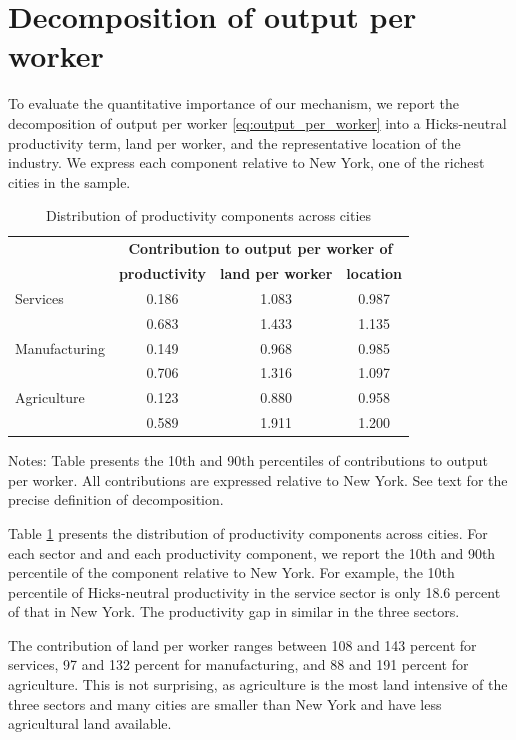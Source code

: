\documentclass[12pt]{article}
\begin{document}
\section{Decomposition of output per worker}
To evaluate the quantitative importance of our mechanism, we report the decomposition of output per worker \eqref{eq:output_per_worker} into a Hicks-neutral productivity term, land per worker, and the representative location of the industry. We express each component relative to New York, one of the richest cities in the sample.

\begin{table}[h!]
  \begin{center}
  \caption{Distribution of productivity components across cities\label{tab:decomposition}}
    \begin{tabular}{lccc}
    \toprule
    \textbf{} & \multicolumn{3}{c}{\textbf{Contribution to output per worker of}}\\
    \textbf{} & \textbf{productivity} & \textbf{land per worker} & \textbf{location} \\
    \midrule
Services	& 0.186	& 1.083	& 0.987	\\
	& 0.683	& 1.433	& 1.135	\\
				
Manufacturing	& 0.149	& 0.968	& 0.985	\\
	& 0.706	& 1.316	& 1.097	\\
				
Agriculture	& 0.123	& 0.880	& 0.958	\\
	& 0.589	& 1.911	& 1.200	\\
    \bottomrule
    \end{tabular}%

  \end{center}
  \noindent \footnotesize{Notes: Table presents the 10th and 90th percentiles of contributions to output per worker. All contributions are expressed relative to New York. See text for the precise definition of decomposition.}
\end{table}

Table \ref{tab:decomposition} presents the distribution of productivity components across cities. For each sector and and each productivity component, we report the 10th and 90th percentile of the component relative to New York. For example, the 10th percentile of Hicks-neutral productivity in the service sector is only 18.6 percent of that in New York. The productivity gap in similar in the three sectors.

The contribution of land per worker ranges between 108 and 143 percent for services, 97 and 132 percent for manufacturing, and 88 and 191 percent for agriculture. This is not surprising, as agriculture is the most land intensive of the three sectors and many cities are smaller than New York and have less agricultural land available.
\end{document}
